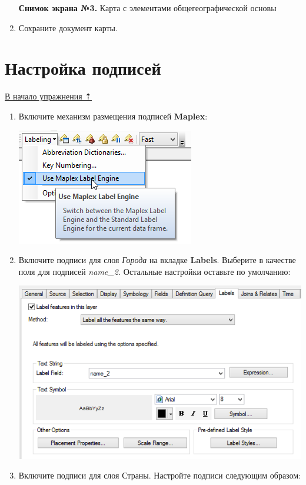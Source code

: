 \documentclass[]{book}
\theoremstyle{definition}
\theoremstyle{definition}
\theoremstyle{definition}
\theoremstyle{remark}
\begin{document}
\begin{enumerate}
  \textbf{Снимок экрана №3.} Карта с элементами общегеографической
  основы
\item
  Сохраните документ карты.
\end{enumerate}

\hypertarget{map-design-economic-labels}{%
\section{Настройка подписей}\label{map-design-economic-labels}}

\protect\hyperlink{map-design-economic}{В начало упражнения ⇡}

\begin{enumerate}
\def\labelenumi{\arabic{enumi}.}
\item
  Включите механизм размещения подписей \textbf{Maplex}:

  \includegraphics{images/Ex04/image26.png}
\item
  Включите подписи для слоя \emph{Города} на вкладке \textbf{Labels}.
  Выберите в качестве поля для подписей \emph{name\_2.} Остальные
  настройки оставьте по умолчанию:

  \includegraphics{images/Ex04/image27.png}
\item
  Включите подписи для слоя Страны. Настройте подписи следующим образом:


\end{enumerate}
\end{document}
